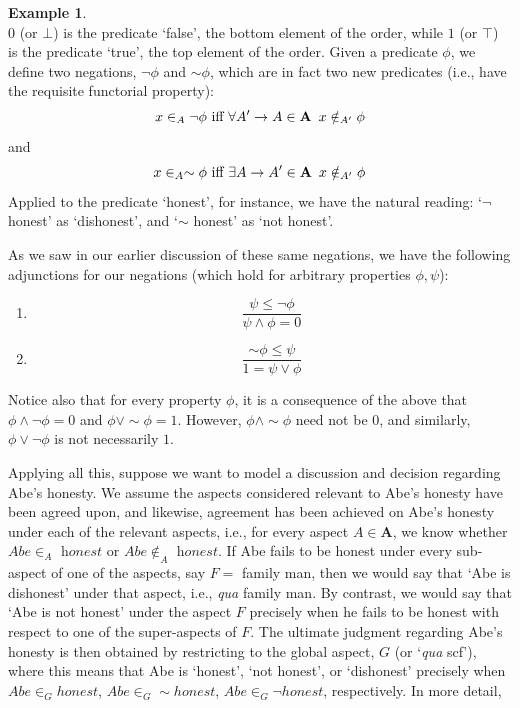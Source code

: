 \documentclass[a4paper]{book}
\theoremstyle{definition}
\newtheorem{example}{Example}[section]
\theoremstyle{definition}
\theoremstyle{definition}
\theoremstyle{theorem}
\theoremstyle{definition}
\begin{document}
\begin{example}
\begin{equation*}
	\end{equation*}
	$0$ (or $\bot$) is the predicate `false', the bottom element of the order, while $1$ (or $\top$) is the predicate `true', the top element of the order. Given a predicate $\phi$, we define two negations, $\neg \phi$ and $\sim \phi$, which are in fact two new predicates (i.e., have the requisite functorial property): 
	\begin{equation*}
	x \in_A \neg \phi \text{ iff } \forall A' \rightarrow A \in \textbf{A} \hspace*{0.5em} x \notin_{A'} \phi
	\end{equation*}
	and 
	\begin{equation*}
	x \in_A \sim \phi \text{ iff } \exists A \rightarrow A' \in \textbf{A} \hspace*{0.5em} x \notin_{A'} \phi
	\end{equation*}
	Applied to the predicate `honest', for instance, we have the natural reading: `$\neg$ honest' as `dishonest', and `$\sim$ honest' as `not honest'. 
	\par 
	As we saw in our earlier discussion of these same negations, we have the following adjunctions for our negations (which hold for arbitrary properties $\phi, \psi$): 
	\begin{enumerate}
		\item \begin{equation*}
		\frac{\psi \leq \neg \phi}{\psi \wedge \phi = 0}
		\end{equation*}
		\item \begin{equation*}
		\frac{\sim \phi \leq \psi}{1 = \psi \vee \phi}
		\end{equation*}
	\end{enumerate}
	Notice also that for every property $\phi$, it is a consequence of the above that $\phi \wedge \neg \phi = 0$ and $\phi \vee \sim \phi = 1$. However, $\phi \wedge \sim \phi$ need not be $0$, and similarly, $\phi \vee \neg \phi$ is not necessarily $1$. \par 
	Applying all this, suppose we want to model a discussion and decision regarding Abe's honesty. We assume the aspects considered relevant to Abe's honesty have been agreed upon, and likewise, agreement has been achieved on Abe's honesty under each of the relevant aspects, i.e., for every aspect $A \in \textbf{A}$, we know whether $Abe \in_A \textit{ honest}$ or $Abe \notin_A \textit{ honest}$. If Abe fails to be honest under every sub-aspect of one of the aspects, say $F = $ family man, then we would say that `Abe is dishonest' under that aspect, i.e., \textit{qua} family man. By contrast, we would say that `Abe is not honest' under the aspect $F$ precisely when he fails to be honest with respect to one of the super-aspects of $F$. The ultimate judgment regarding Abe's honesty is then obtained by restricting to the global aspect, $G$ (or `\textit{qua} scf'), where this means that Abe is `honest', `not honest', or `dishonest' precisely when $Abe \in_G honest$, $Abe \in_G \sim honest$, $Abe \in_G \neg honest$, respectively. In more detail, 

\end{example}
\end{document}
